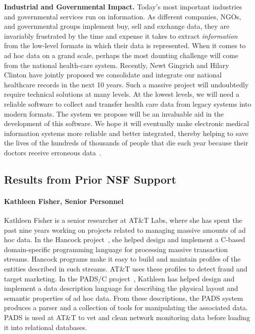 \documentclass[11pt]{article}
\begin{document}
\noindent
{\bf Industrial and Governmental Impact.}
Today's most important industries and governmental services
run on information.  As different companies, NGOs,
and governmental groups implement buy, sell
and exchange data, they are invariably frustrated by the time and expense
it takes to extract {\em information} from the low-level
formats in which their data is represented.  
When it comes to ad hoc data on a grand scale,
perhaps the most daunting challenge will come from the national
health-care system.  Recently, Newt Gingrich and Hilary Clinton have
jointly proposed we consolidate and integrate our national healthcare
records in the next 10 years.  Such a massive project will undoubtedly
require technical solutions at many levels.  At the lowest levels, we
will need a reliable software to collect and transfer health care data
from legacy systems into modern formats.  The \datatype{} system we
propose will be an invaluable aid in the development of this software.
We hope it will eventually make electronic medical information systems
more reliable and better integrated, thereby helping 
to save the lives of the hundreds of thousands of people that die
each year because their doctors receive erroneous data~\cite{rudlin:pc}.

\subsection{Results from Prior NSF Support}
\label{sec:results}

\paragraph*{Kathleen Fisher, Senior Personnel} 
Kathleen Fisher is a senior researcher at AT\&T Labs,
where she has spent the past nine years working on projects
related to managing massive amounts of ad hoc data.
In the Hancock project~\cite{kdd00,hancock-toplas}, she helped design and implement a C-based
domain-specific programming language for processing massive  
transaction streams.  Hancock programs make it easy to build
and maintain profiles of the entities described in such streams. 
AT\&T uses these profiles to detect fraud and target marketing.
In the PADS/C project~\cite{fisher+:pads}, 
Kathleen has helped design and implement
a data description language for describing the physical layout
and semantic properties of ad hoc data.  From these descriptions,
the PADS system produces a parser and a collection of tools for
manipulating the associated data.  PADS is used at AT\&T to
vet and clean network monitoring data before loading it into
relational databases.  
\end{document}
